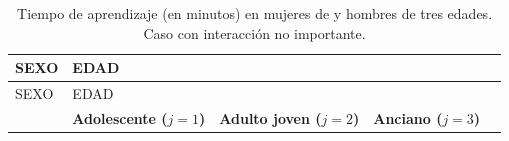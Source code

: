 \documentclass[]{book}
\theoremstyle{definition}
\theoremstyle{definition}
\theoremstyle{definition}
\theoremstyle{remark}
\begin{document}
\begin{longtable}[]{@{}lllll@{}}
\caption{\label{tab:aprendizaje4} Tiempo de aprendizaje (en minutos) en
mujeres de y hombres de tres edades. Caso con interacción no
importante.}\tabularnewline
\toprule
\begin{minipage}[b]{0.15\columnwidth}\raggedright
SEXO\strut
\end{minipage} & \begin{minipage}[b]{0.17\columnwidth}\raggedright
EDAD\strut
\end{minipage} & \begin{minipage}[b]{0.17\columnwidth}\raggedright
\strut
\end{minipage} & \begin{minipage}[b]{0.16\columnwidth}\raggedright
\strut
\end{minipage} & \begin{minipage}[b]{0.20\columnwidth}\raggedright
\strut
\end{minipage}\tabularnewline
\midrule
\endfirsthead
\toprule
\begin{minipage}[b]{0.15\columnwidth}\raggedright
SEXO\strut
\end{minipage} & \begin{minipage}[b]{0.17\columnwidth}\raggedright
EDAD\strut
\end{minipage} & \begin{minipage}[b]{0.17\columnwidth}\raggedright
\strut
\end{minipage} & \begin{minipage}[b]{0.16\columnwidth}\raggedright
\strut
\end{minipage} & \begin{minipage}[b]{0.20\columnwidth}\raggedright
\strut
\end{minipage}\tabularnewline
\midrule
\endhead
\begin{minipage}[t]{0.15\columnwidth}\raggedright
\strut
\end{minipage} & \begin{minipage}[t]{0.17\columnwidth}\raggedright
\textbf{Adolescente (\(j = 1\))}\strut
\end{minipage} & \begin{minipage}[t]{0.17\columnwidth}\raggedright
\textbf{Adulto joven (\(j = 2\))}\strut
\end{minipage} & \begin{minipage}[t]{0.16\columnwidth}\raggedright
\textbf{Anciano (\(j = 3\)) }\strut
\end{minipage} & \begin{minipage}[t]{0.20\columnwidth}\raggedright

\end{minipage}
\end{longtable}
\end{document}
